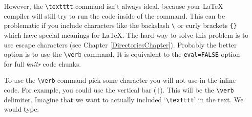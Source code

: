 However, the \verb|\textttt| command isn't always ideal, because your LaTeX compiler will still try to run the code inside of the command. This can be problematic if you include characters like the backslash \verb|\| or curly brackets \verb|{}| which have special meanings for LaTeX. The hard way to solve this problem is to use escape characters (see Chapter \ref{DirectoriesChapter}). Probably the better option is to use the \verb|\verb| command. It is equivalent to the \texttt{eval=FALSE} option for full {\emph{knitr}} code chunks. 

To use the \verb|\verb| command pick some character you will not use in the inline code. For example, you could use the vertical bar (\texttt{|}). This will be the \verb|\verb| delimiter. Imagine that we want to actually included `\verb|\textttt|' in the text. We would type:















